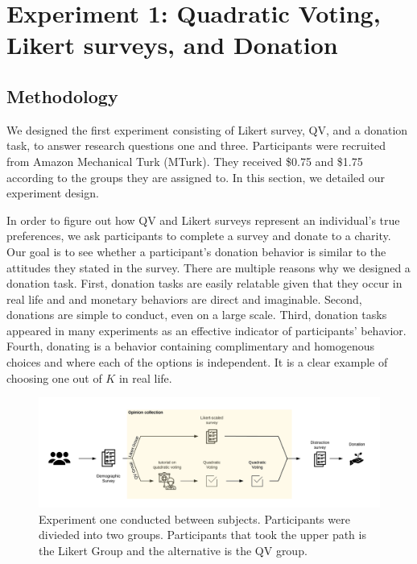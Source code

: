 \section{Experiment 1: Quadratic Voting, Likert surveys, and Donation}
\subsection{Methodology} \label{method-1}
We designed the first experiment 
consisting of Likert survey, QV, and a donation task,
to answer research questions one and three. 
Participants were recruited from Amazon Mechanical Turk (MTurk).
They received \$0.75 and \$1.75 according to the groups they are assigned to.
In this section, 
we detailed our experiment design.

In order to figure out 
how QV and Likert surveys 
represent an individual's true preferences,
we ask participants to complete a survey
and donate to a charity.
Our goal is to see 
whether a participant's donation behavior is similar to 
the attitudes they stated in the survey.
There are multiple reasons
why we designed a donation task.
First, donation tasks are easily relatable
given that they occur in real life and
and monetary behaviors are direct and imaginable.
Second, donations are simple to conduct,
even on a large scale.
Third, donation tasks appeared in many experiments 
\cite{Xiao2019, benz2008people, gendall2010effect} 
as an effective indicator of participants' behavior.
Fourth, donating is a behavior containing
complimentary and homogenous choices and
where each of the options is independent.
It is a clear example of choosing one out of $K$ in real life.

\begin{figure}[htpb]
    \centering
    \includegraphics[width=\textwidth, keepaspectratio=true]{content/image/exp1_flow.png}
    \caption{
        Experiment one conducted between subjects. Participants were divieded into two groups. Participants that took the upper path is the Likert Group and the alternative is the QV group.
    }
    \label{fig:exp1_image_flow}
\end{figure}

